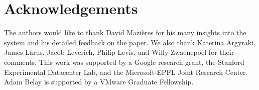 
\section*{Acknowledgements}

The authors would like to thank David Mazi{\`e}res for his many
insights into the system and his detailed feedback on the
paper. We also thank Katerina Argyraki, James Larus, Jacob Leverich, Philip Levis, and Willy
Zwaenepoel for their comments. This work was supported by a Google
research grant, the Stanford Experimental Datacenter Lab, and the Microsoft-EPFL Joint Research Center. Adam Belay is supported
by a VMware Graduate Fellowship.  



